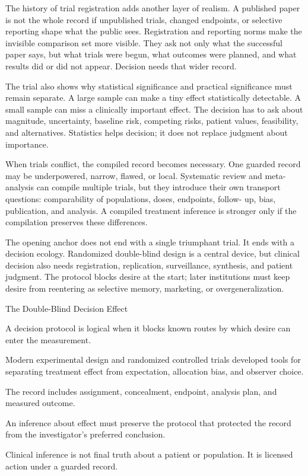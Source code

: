The history of trial registration adds another layer of realism. A published
paper is not the whole record if unpublished trials, changed endpoints, or
selective reporting shape what the public sees. Registration and reporting
norms make the invisible comparison set more visible. They ask not only what
the successful paper says, but what trials were begun, what outcomes were
planned, and what results did or did not appear. Decision needs that wider
record.

The trial also shows why statistical significance and practical significance
must remain separate. A large sample can make a tiny effect statistically
detectable. A small sample can miss a clinically important effect. The
decision has to ask about magnitude, uncertainty, baseline risk, competing
risks, patient values, feasibility, and alternatives. Statistics helps
decision; it does not replace judgment about importance.

When trials conflict, the compiled record becomes necessary. One guarded
record may be underpowered, narrow, flawed, or local. Systematic review and
meta-analysis can compile multiple trials, but they introduce their own
transport questions: comparability of populations, doses, endpoints, follow-
up, bias, publication, and analysis. A compiled treatment inference is
stronger only if the compilation preserves these differences.

The opening anchor does not end with a single triumphant trial. It ends with a
decision ecology. Randomized double-blind design is a central
device, but clinical decision also needs registration, replication,
surveillance, synthesis, and patient judgment. The protocol blocks desire at
the start; later institutions must keep desire from reentering as selective
memory, marketing, or overgeneralization.

\begin{phenom}{The Double-Blind Decision Effect~\cite{fisher1935}}
\label{ph:double-blind-decision}

\PhStatement
A decision protocol is logical when it blocks known routes by which desire can
enter the measurement.

\PhOrigin
Modern experimental design and randomized controlled trials developed tools
for separating treatment effect from expectation, allocation bias, and observer
choice.

\PhObservation
The record includes assignment, concealment, endpoint, analysis plan, and
measured outcome.

\PhConstraint
An inference about effect must preserve the protocol that protected the record
from the investigator's preferred conclusion.

\PhConsequence
Clinical inference is not final truth about a patient or population. It is
licensed action under a guarded record.
\end{phenom}

